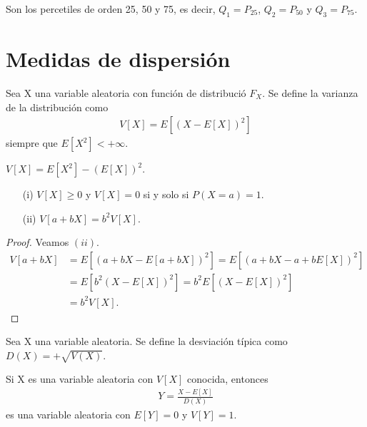 \begin{defi}[Cuartiles]
Son los percetiles de orden 25, 50 y 75, es decir, $Q_1 = P_{25}$, $Q_2 = P_{50}$ y $Q_3 = P_{75}$.
\end{defi}

\section{Medidas de dispersión}

\begin{defi}[Varianza]
Sea X una variable aleatoria con función de distribució $F_X$. Se define la varianza de la distribución como
\begin{align*}
    V[X] = E[(X - E[X])^2]
\end{align*}
siempre que $E[X^2] < +\infty$.
\end{defi}

\begin{obs} 
$V[X] = E[X^2] - (E[X])^2$.
\end{obs}

\begin{prop}
\begin{enumerate}
    \item[(i)] $V[X] \ge 0$ y $V[X] = 0$ si y solo si $P(X = a) = 1$.
    \item[(ii)] $V[a + bX] = b^2V[X]$.
\end{enumerate}
\end{prop}

\begin{proof}
Veamos $(ii)$. 
\begin{align*}
    V[a + bX] &= E[(a + bX - E[a + bX])^2] = E[(a + bX - a + bE[X])^2] \\
    &= E[b^2(X - E[X])^2] = b^2E[(X - E[X])^2]\\
    &= b^2V[X].
\end{align*}
\end{proof}

\begin{defi}
Sea X una variable aleatoria. Se define la desviación típica como $D(X) = +\sqrt{V(X)}$.
\end{defi}

\begin{obs}
Si X es una variable aleatoria con $V[X]$ conocida, entonces
\begin{align*}
    Y = \frac{X - E[X]}{D(X)}
\end{align*}
es una variable aleatoria con $E[Y] = 0$ y $V[Y] = 1$.
\end{obs}

